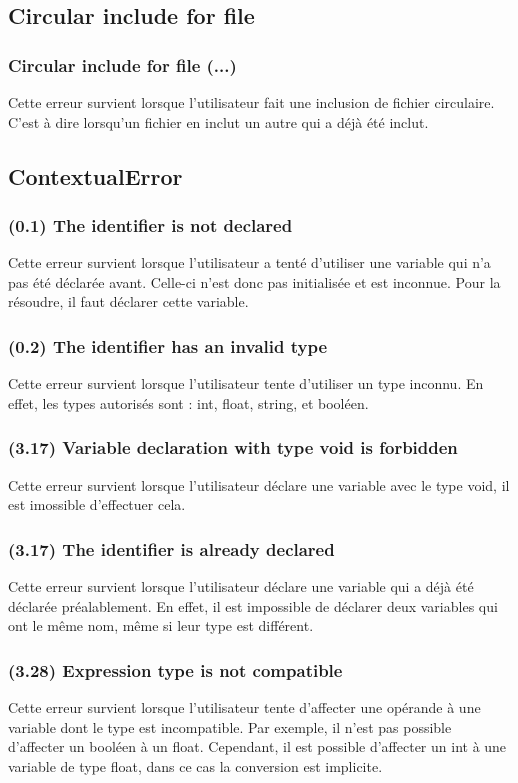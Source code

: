 \documentclass[12pt, a4paper, one side]{article}
\begin{document}
\subsection{Circular include for file }
\subsubsection{Circular include for file (...)}
Cette erreur survient lorsque l'utilisateur fait une inclusion de fichier circulaire. C'est à dire lorsqu'un fichier en inclut un autre qui a déjà été inclut.


\subsection{ContextualError}
\subsubsection{(0.1) The identifier is not declared}
Cette erreur survient lorsque l'utilisateur a tenté d'utiliser une variable qui n'a pas été déclarée avant. Celle-ci n'est donc
pas initialisée et est inconnue. Pour la résoudre, il faut déclarer cette variable.

\subsubsection{(0.2) The identifier has an invalid type}
Cette erreur survient lorsque l'utilisateur tente d'utiliser un type inconnu. En effet, les types autorisés sont : int, float, string, et booléen.

\subsubsection{(3.17) Variable declaration with type void is forbidden}
Cette erreur survient lorsque l'utilisateur déclare une variable avec le type void, il est imossible d'effectuer cela.

\subsubsection{(3.17) The identifier is already declared}
Cette erreur survient lorsque l'utilisateur déclare une variable qui a déjà été déclarée préalablement. En effet, il est impossible de déclarer deux variables qui ont le même nom, même si leur type est différent.

\subsubsection{(3.28) Expression type is not compatible}
Cette erreur survient lorsque l'utilisateur tente d'affecter une opérande à une variable dont le type est incompatible. Par exemple, il n'est pas possible d'affecter un booléen à un float. Cependant, il est possible d'affecter un int à une variable de type float, dans ce cas la conversion est implicite.
\end{document}
